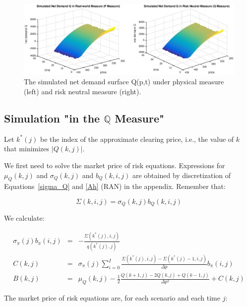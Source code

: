 \documentclass{article}
\begin{document}
\begin{center}
\begin{figure}[tbp]
\centering
\includegraphics[scale = 0.5]{Q_both_measures.eps}\newline
\caption{The simulated net demand surface Q(p,t) under physical measure
(left) and risk neutral measure (right).}
\label{fig::AAPL_20110401_simulated_both_measures}
\end{figure}
\end{center}

\subsection{Simulation "in the $\mathbb{Q}$ Measure"}

Let $k^{\ast }(j)$ be the index of the approximate clearing price, i.e., the
value of $k$ that minimizes $|Q(k,j)|$.

We first need to solve the market price of risk equations. Expressions for $%
\mu _{Q}(k,j)$ and $\sigma _{Q}(k,j)$ and $b_{Q}(k,i,j)$ are obtained by
discretization of Equations~\ref{sigma_Q} and \ref{Ah} (RAN) in the appendix. Remember that:

\begin{equation*}
\Sigma(k,i,j)=\sigma _{Q}(k,j)b_{Q}(k,i,j)
\end{equation*}

We calculate:

\begin{eqnarray*}
\sigma _{\pi }(j)b_{\pi }(i,j) &=&-\frac{\Sigma(k^{\ast }(j),i,j)}{q(k^{\ast
}(j),j)} \\
C(k,j) &=&\sigma _{\pi }(j)\sum_{i=0}^{I}\frac{\Sigma(k^{\ast
}(j),i,j)-\Sigma(k^{\ast }(j)-1,i,j)}{\Delta p}b_{\pi }(i,j) \\
B(k,j) &=&\mu _{Q}(k,j)-\frac{1}{2}\frac{Q(k+1,j)-2Q(k,j)+Q(k-1,j)}{\Delta
p^{2}}+C(k,j)
\end{eqnarray*}

The market price of risk equations are, for each scenario and each time $j$:
\end{document}
